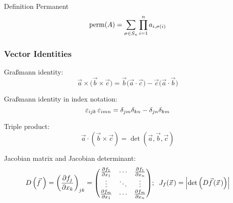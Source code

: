 			\noindent
			Definition Permanent
			\begin{equation}
				\mathrm{perm}(A) = \sum_{\sigma\in S_n} \prod_{i=1}^n a_{i,\sigma(i)}
			\end{equation}

		\subsubsection{Vector Identities}
			\noindent
			Graßmann identity:
			\begin{equation}
				\vec{a}\times\big(\vec{b}\times\vec{c}\big) = \vec{b}\big(\vec{a}\cdot\vec{c}\big) - \vec{c}\big(\vec{a}\cdot\vec{b}\big)
			\end{equation}

			\noindent
			Graßmann identity in index notation:
			\begin{equation}
				\varepsilon_{ijk}\,\varepsilon_{imn}=\delta_{jm}\delta_{kn}-\delta_{jn}\delta_{km}
			\end{equation}

			\noindent
			Triple product:
			\begin{equation}
				\vec{a}\cdot\left(\vec{b}\times\vec{c}\right) = \det\left(\vec{a},\vec{b},\vec{c}\right)
			\end{equation}

			\noindent
			Jacobian matrix and Jacobian determinant:
			\begin{equation}
				D\left(\vec{f}\,\right) = \left(\frac{\partial f_j}{\partial x_k}\right)_{jk}
				= \mqty(
				\frac{\partial f_1}{\partial x_1} & \dotsb & \frac{\partial f_1}{\partial x_n} \\
				\vdots & \ddots & \vdots \\
				\frac{\partial f_m}{\partial x_1} & \dotsb & \frac{\partial f_m}{\partial x_n} \\
				);\;\;J_f(\vec{x})=\abs{\det\left(D\vec{f}(\vec{x})\right)}
			\end{equation}

